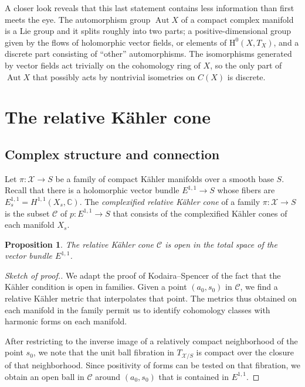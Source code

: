 \documentclass[11pt,a4paper]{amsart}
\newtheorem{prop}[theo]{Proposition}
\theoremstyle{definition}
\theoremstyle{remark}
\newcommand{\CC}{\mathbb{C}}
\newcommand{\Aut}{\mathop{\mathrm{Aut}}}
\def\cX{\mathcal{X}}
\def\coho#1{\mathrm{H}^{#1}}
\def\KC{C}
\def\RKC{\mathcal{\KC}}
\begin{document}
A closer look reveals that this last statement contains less information
than first meets the eye. The automorphism group $\Aut X$ of a compact
complex manifold is a Lie group and it splits roughly into two parts; a
positive-dimensional group given by the flows of holomorphic vector
fields, or elements of $\coho{0}(X,T_X)$, and a discrete part consisting of
``other'' automorphisms. The isomorphisms generated by vector fields act
trivially on the cohomology ring of $X$, so the only part of $\Aut X$
that possibly acts by nontrivial isometries on $\KC(X)$ is discrete.


\section{The relative K\"{a}hler cone}
\label{sefi}


\subsection*{Complex structure and connection}

Let $\pi : \cX \to S$ be a family of compact K\"{a}hler manifolds over
a smooth base $S$. Recall that there is a holomorphic vector bundle
$E^{1,1} \to S$ whose fibers are $E^{1,1}_s = H^{1,1}(X_s,\CC)$. The
\emph{complexified relative K\"{a}hler cone} of a family $\pi : \cX
\to   S$ is the subset $\RKC$ of $p : E^{1,1} \to S$ that consists
of the complexified K\"{a}hler cones of each manifold $X_s$.

\begin{prop}
The relative K\"{a}hler cone $\RKC$ is open in the total space of
the vector bundle $E^{1,1}$.
\end{prop}

\begin{proof}[Sketch of proof.]
We adapt the proof of Kodaira--Spencer \cite{KodairaSpencerIII} of
the fact that the K\"{a}hler condition is open in families. Given a
point $(a_0,s_0)$ in $\RKC$, we find a relative K\"{a}hler metric that
interpolates that point. The metrics thus obtained on each manifold
in the family permit us to identify cohomology classes with harmonic
forms on each manifold.

After restricting to the inverse image of a relatively compact
neighborhood of the point $s_0$, we note that the unit ball
fibration in $T_{\cX/S}$ is compact over the closure of that
neighborhood. Since positivity of forms can be tested on that
fibration, we obtain an open ball in $\RKC$ around $(a_0,s_0)$
that is contained in $E^{1,1}$.
\end{proof}
\end{document}
